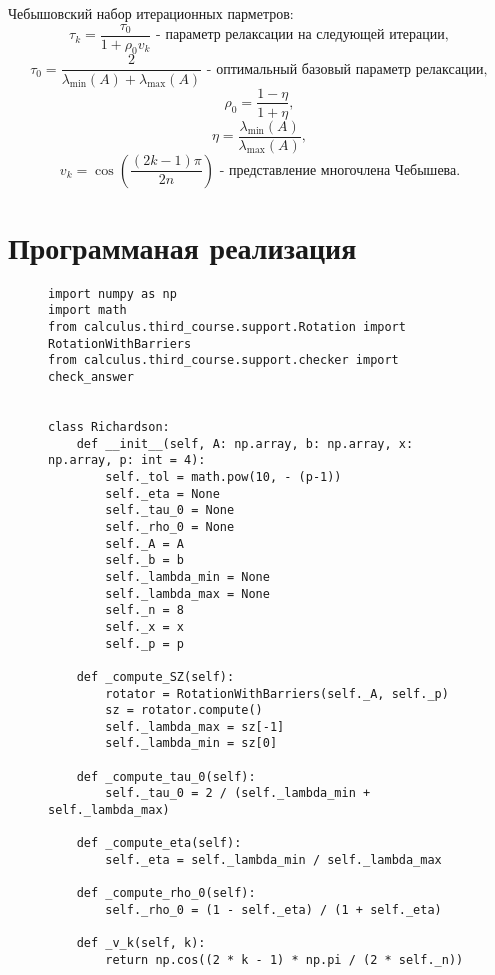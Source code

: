 \documentclass[a4paper,12pt]{article}
\begin{document}
	Чебышовский набор итерационных парметров:
	$$\tau_k = \frac{\tau_0}{1 + \rho_0 v_k} \text{ - параметр релаксации на следующей итерации},$$
	$$\tau_0 = \frac{2}{\lambda_{\min}(A) + \lambda_{\max}(A)} \text{ - оптимальный базовый параметр релаксации},$$
	$$\rho_0 = \frac{1 - \eta}{1 + \eta},$$
	$$\eta = \frac{\lambda_{\min}(A)}{\lambda_{\max}(A)},$$
	$$v_k = \cos\left(\frac{(2k - 1)\pi}{2n}\right) \text{ - представление многочлена Чебышева}.$$
	
	\newpage
	\section{Программаная реализация}
	\begin{figure}[h]
		\begin{verbatim}
import numpy as np
import math
from calculus.third_course.support.Rotation import RotationWithBarriers
from calculus.third_course.support.checker import check_answer


class Richardson:
	def __init__(self, A: np.array, b: np.array, x: np.array, p: int = 4):
		self._tol = math.pow(10, - (p-1))
		self._eta = None
		self._tau_0 = None
		self._rho_0 = None
		self._A = A
		self._b = b
		self._lambda_min = None
		self._lambda_max = None
		self._n = 8
		self._x = x
		self._p = p
	
	def _compute_SZ(self):
		rotator = RotationWithBarriers(self._A, self._p)
		sz = rotator.compute()
		self._lambda_max = sz[-1]
		self._lambda_min = sz[0]
	
	def _compute_tau_0(self):
		self._tau_0 = 2 / (self._lambda_min + self._lambda_max)
	
	def _compute_eta(self):
		self._eta = self._lambda_min / self._lambda_max
	
	def _compute_rho_0(self):
		self._rho_0 = (1 - self._eta) / (1 + self._eta)

	def _v_k(self, k):
		return np.cos((2 * k - 1) * np.pi /	(2 * self._n))
		\end{verbatim}
	\end{figure}
	\newpage
\end{document}
